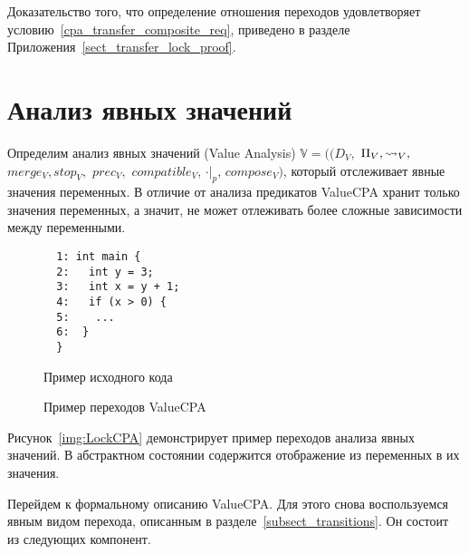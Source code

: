 Доказательство того, что определение отношения переходов удовлетворяет условию~\ref{cpa_transfer_composite_req}, приведено в разделе Приложения~\ref{sect_transfer_lock_proof}. 


\section{Анализ явных значений}
\label{sect_value_analysis}

Определим анализ явных значений (Value Analysis) $\mathbb{V}=((D_{V},$ $\Pi_{V}, \leadsto_{V},$ $merge_{V}, stop_{V},$ $prec_{V},$ $compatible_{V}$, $\cdot|_p$, $compose_V)$, который отслеживает явные значения переменных.
В отличие от анализа предикатов ValueCPA хранит только значения переменных, а значит, не может отлеживать более сложные зависимости между переменными. 

\begin{figure}[h]
\begin{minipage}[h]{0.3\textwidth}
\begin{verbatim}
  1: int main {
  2:   int y = 3;
  3:   int x = y + 1;
  4:   if (x > 0) {
  5:    ...
  6:  }
  }
\end{verbatim}
\caption{Пример исходного кода}
\label{ValueCodeExample}
\end{minipage}
\hfill
\begin{minipage}{0.65\textwidth}
    \caption{Пример переходов ValueCPA}
    \label{img:ValueCPA}
\end{minipage}
\end{figure}

Рисунок~\ref{img:LockCPA} демонстрирует пример переходов анализа явных значений.
В абстрактном состоянии содержится отображение из переменных в их значения. 

Перейдем к формальному описанию ValueCPA.
Для этого снова воспользуемся явным видом перехода, описанным в разделе~\ref{subsect_transitions}.
Он состоит из следующих компонент.

